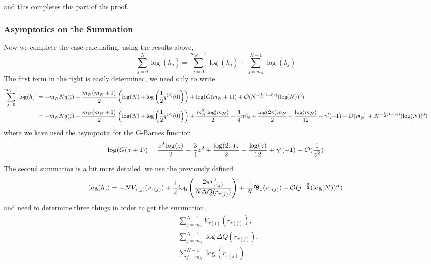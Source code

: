 and this completes this part of the proof.  

\subsubsection{Asymptotics on the Summation}

Now we complete the case calculating, using the results above,
\begin{equation}
	\sum_{j=0}^{N} \log(h_j) = \sum_{j=0}^{m_N - 1} \log(h_j)  + \sum_{j=m_N}^{N - 1} \log(h_j) 
\end{equation}
The first term in the right is easily determined, we need only to write
\begin{align}
	\sum_{j=0}^{m_N - 1} \log(h_j) & = -m_N N q(0) - \frac{m_N(m_N + 1)}{2} \left( \log(N) + \log\left( \frac{1}{2} q^{(2)}(0) \right) \right) + \log(G(m_N + 1)) + \mathcal{O}(N^{-\frac{1}{2}(1-5\epsilon)} (\log(N))^3) \\
	& = -m_N N q(0) - \frac{m_N(m_N + 1)}{2} \left( \log(N) + \log\left( \frac{1}{2} q^{(2)}(0) \right)  \right) +  \frac{m_N^2 \log(m_N)}{2} - \frac{3}{4} m_N^2 + \frac{\log(2\pi) m_N}{2} - \frac{\log(m_N)}{12} + \gamma'(-1)+ \mathcal{O}(m_N^{-2}+ N^{-\frac{1}{2}(1-5\epsilon)} (\log(N))^3)
\end{align}
where we have used the asymptotic for the G-Barnes function
\begin{equation}
	\log(G(z+1)) = \frac{z^2 \log(z)}{2} - \frac{3}{4} z^2 + \frac{\log(2\pi) z}{2} - \frac{\log(z)}{12} + \gamma'(-1) + \mathcal{O}(\frac{1}{z^2})
\end{equation}

The second summation is a bit more detailed, we use the previously defined
\begin{equation}
	\log(h_j) = -N V_{\tau(j)} (r_{\tau(j)}) + \frac{1}{2} \log{\left( \frac{2\pi r^2_{\tau(j)}}{N \Delta Q(r_{\tau(j)})} \right)} + \frac{1}{N} \mathfrak{B}_1(r_{\tau(j)}) + \mathcal{O}(j^{-\frac{3}{2}} (\log(N))^\alpha)
\end{equation}
and need to determine three things in order to get the summation,
\begin{align}
	& \sum_{j=m_N}^{N-1} V_{\tau(j)}(r_{\tau(j)}), \\
	& \sum_{j=m_N}^{N-1} \log \Delta Q(r_{\tau(j)}), \\
	&  \sum_{j=m_N}^{N-1} \log(r_{\tau(j)}).
\end{align}

